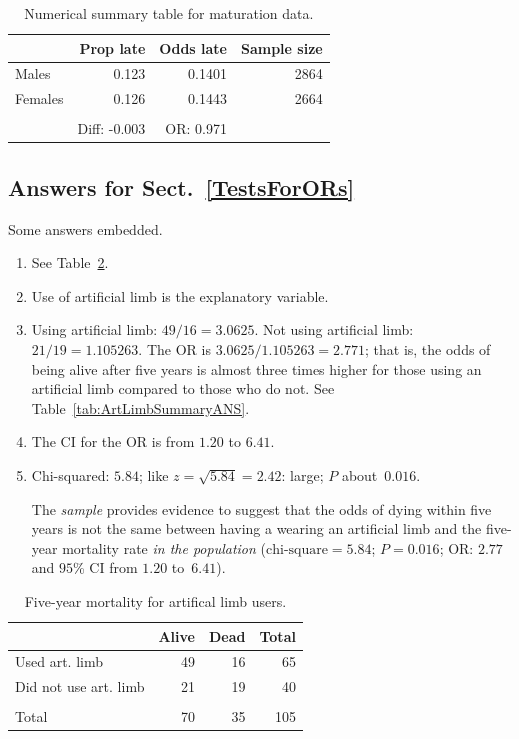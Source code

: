 \documentclass[
  11pt,
  a4paper,
  krantz2]{krantz}
\providecommand{\tightlist}{%
  \setlength{\itemsep}{0pt}\setlength{\parskip}{0pt}}
\begin{document}
\begin{footnotesize}
\begin{table}
\centering
\caption{\label{tab:MatNumSummary}Numerical summary table for maturation data.}
\centering
\fontsize{8}{10}\selectfont
\begin{tabular}[t]{lrrr}
\toprule
\textbf{ } & \textbf{Prop late} & \textbf{Odds late} & \textbf{Sample size}\\
\midrule
Males & 0.123 & 0.1401 & 2864\\
Females & 0.126 & 0.1443 & 2664\\
\midrule\\
 & Diff: -0.003 & OR: 0.971 & \\
\bottomrule
\end{tabular}
\end{table}

\subsection*{Answers for Sect.~\ref{TestsForORs}}\label{answers-for-sect.-reftestsforors}

Some answers embedded.

\begin{enumerate}
\def\labelenumi{\arabic{enumi}.}
\item
  See Table~\ref{tab:ArtLimbMortalityANS}. \tightlist
\item
  Use of artificial limb is the explanatory variable.
\item
  Using artificial limb: \(49/16 = 3.0625\).
  Not using artificial limb: \(21/19 = 1.105263\).
  The OR is \(3.0625/1.105263 = 2.771\); that is, the odds of being alive after five years is almost three times higher for those using an artificial limb compared to those who do not.
  See Table~\ref{tab:ArtLimbSummaryANS}.
\item
  The CI for the OR is from \(1.20\) to \(6.41\).
\item
  Chi-squared: \(5.84\); like \(z = \sqrt{5.84} = 2.42\): large; \(P\) about~\(0.016\).

  The \emph{sample} provides evidence to suggest that the odds of dying within five years is not the same between having a wearing an artificial limb and the five-year mortality rate \emph{in the population} (\(\text{chi-square} = 5.84\); \(P = 0.016\); OR: \(2.77\) and \(95\)\% CI from \(1.20\) to~\(6.41\)).
\end{enumerate}

\begin{table}
\centering
\caption{\label{tab:ArtLimbMortalityANS}Five-year mortality for artifical limb users.}
\centering
\fontsize{8}{10}\selectfont
\begin{tabular}[t]{lrrr}
\toprule
\textbf{ } & \textbf{Alive} & \textbf{Dead} & \textbf{Total}\\
\midrule
Used art. limb & 49 & 16 & 65\\
Did not use art. limb & 21 & 19 & 40\\
\midrule\\
Total & 70 & 35 & 105\\
\bottomrule
\end{tabular}
\end{table}


\end{footnotesize}
\end{document}
